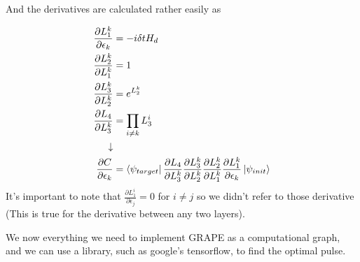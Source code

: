 And the derivatives are calculated rather easily as

\begin{align*}
    \frac{\partial L_1^k}{\partial \epsilon_k} &= -i \delta t H_d\\
    \frac{\partial L_2^k}{\partial L_1^k} &= 1 \\
    \frac{\partial L_3^k}{\partial L_2^k} &= e^{L_2^k} \\
    \frac{\partial L_4}{\partial L_3^k} &= \prod_{i \ne k} L_3^i \\
    \downarrow \\
    \frac{\partial C}{\partial \epsilon_k} &= \bra{\psi_{target}}  \frac{\partial L_4}{\partial L_3^k}  \frac{\partial L_3^k}{\partial L_2^k} \frac{\partial L_2^k}{\partial L_1^k}  \frac{\partial L_1^k}{\partial \epsilon_k} \ket{\psi_{init}}
\end{align*}
It's important to note that $\frac{\partial L_1^i}{\partial \epsilon_j} = 0$ for $i \ne j$ so we didn't refer to those derivative (This is true for the derivative between any two layers).

We now everything we need to implement GRAPE as a computational graph, and we can use a library, such as google's tensorflow, to find the optimal pulse.